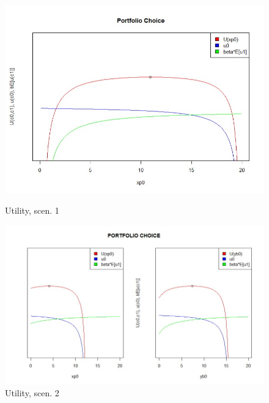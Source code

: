 \begin{figure}[h!]
  \centering
  \begin{minipage}[b]{0.44\textwidth}
    \includegraphics[width=\textwidth, trim = 10 0 30 40,clip]{files/2.1.jpg}
    \caption{Utility, scen. 1}
  \end{minipage}
  \hfill
  \begin{minipage}[b]{0.53\textwidth}
    \includegraphics[width=\textwidth, trim = 10 0 20 40,clip]{files/3.1.jpg}
    \caption{Utility, scen. 2}
  \end{minipage}
\end{figure}

\bigskip

